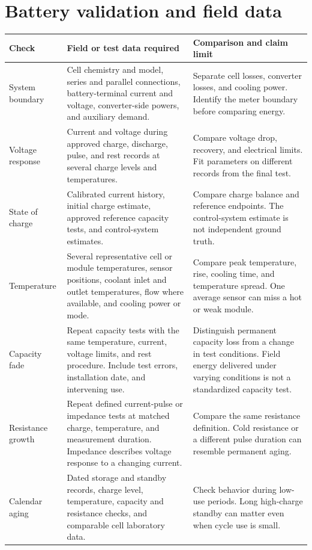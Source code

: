 \documentclass[11pt,a4paper]{report}
\begin{document}
\section{Battery validation and field data}
\begin{longtable}{L{0.18\textwidth}L{0.35\textwidth}L{0.35\textwidth}}
\toprule Check & Field or test data required & Comparison and claim limit \\ \midrule\endhead
System boundary & Cell chemistry and model, series and parallel connections, battery-terminal current and voltage, converter-side powers, and auxiliary demand. & Separate cell losses, converter losses, and cooling power. Identify the meter boundary before comparing energy. \\
Voltage response & Current and voltage during approved charge, discharge, pulse, and rest records at several charge levels and temperatures. & Compare voltage drop, recovery, and electrical limits. Fit parameters on different records from the final test. \\
State of charge & Calibrated current history, initial charge estimate, approved reference capacity tests, and control-system estimates. & Compare charge balance and reference endpoints. The control-system estimate is not independent ground truth. \\
Temperature & Several representative cell or module temperatures, sensor positions, coolant inlet and outlet temperatures, flow where available, and cooling power or mode. & Compare peak temperature, rise, cooling time, and temperature spread. One average sensor can miss a hot or weak module. \\
Capacity fade & Repeat capacity tests with the same temperature, current, voltage limits, and rest procedure. Include test errors, installation date, and intervening use. & Distinguish permanent capacity loss from a change in test conditions. Field energy delivered under varying conditions is not a standardized capacity test. \\
Resistance growth & Repeat defined current-pulse or impedance tests at matched charge, temperature, and measurement duration. Impedance describes voltage response to a changing current. & Compare the same resistance definition. Cold resistance or a different pulse duration can resemble permanent aging. \\
Calendar aging & Dated storage and standby records, charge level, temperature, capacity and resistance checks, and comparable cell laboratory data. & Check behavior during low-use periods. Long high-charge standby can matter even when cycle use is small. \\

\end{longtable}
\end{document}
